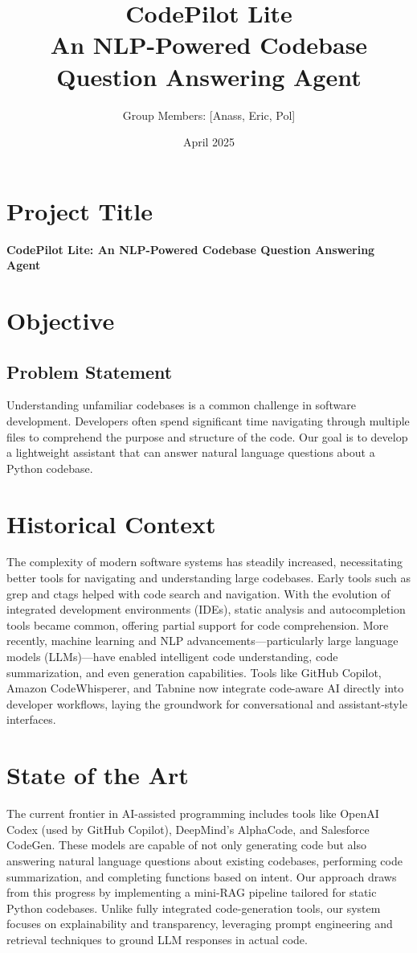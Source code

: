 \documentclass[11pt]{article}
\title{\vspace{-2cm}CodePilot Lite\\ \large An NLP-Powered Codebase Question Answering Agent}
\author{Group Members: [Anass, Eric, Pol]}
\date{April 2025}
\begin{document}
\maketitle

\section{Project Title}
\textbf{CodePilot Lite: An NLP-Powered Codebase Question Answering Agent}

\section{Objective}
\subsection*{Problem Statement}
Understanding unfamiliar codebases is a common challenge in software development. Developers often spend significant time navigating through multiple files to comprehend the purpose and structure of the code. Our goal is to develop a lightweight assistant that can answer natural language questions about a Python codebase.

\section{Historical Context}
The complexity of modern software systems has steadily increased, necessitating better tools for navigating and understanding large codebases. Early tools such as grep and ctags helped with code search and navigation. With the evolution of integrated development environments (IDEs), static analysis and autocompletion tools became common, offering partial support for code comprehension. More recently, machine learning and NLP advancements—particularly large language models (LLMs)—have enabled intelligent code understanding, code summarization, and even generation capabilities. Tools like GitHub Copilot, Amazon CodeWhisperer, and Tabnine now integrate code-aware AI directly into developer workflows, laying the groundwork for conversational and assistant-style interfaces.

\section{State of the Art}
The current frontier in AI-assisted programming includes tools like OpenAI Codex (used by GitHub Copilot), DeepMind's AlphaCode, and Salesforce CodeGen. These models are capable of not only generating code but also answering natural language questions about existing codebases, performing code summarization, and completing functions based on intent. Our approach draws from this progress by implementing a mini-RAG pipeline tailored for static Python codebases. Unlike fully integrated code-generation tools, our system focuses on explainability and transparency, leveraging prompt engineering and retrieval techniques to ground LLM responses in actual code.
\end{document}

